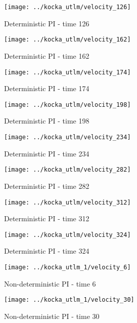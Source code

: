 \begin{figure}[h]
 \centering 
 \texttt{[image: ../kocka\_utlm/velocity\_126]}
 \caption{Deterministic PI - time 126}
\end{figure}


\begin{figure}[h]
 \centering 
 \texttt{[image: ../kocka\_utlm/velocity\_162]}
 \caption{Deterministic PI - time 162}
\end{figure}


\begin{figure}[h]
 \centering 
 \texttt{[image: ../kocka\_utlm/velocity\_174]}
 \caption{Deterministic PI - time 174}
\end{figure}


\begin{figure}[h]
 \centering 
 \texttt{[image: ../kocka\_utlm/velocity\_198]}
 \caption{Deterministic PI - time 198}
\end{figure}


\begin{figure}[h]
 \centering 
 \texttt{[image: ../kocka\_utlm/velocity\_234]}
 \caption{Deterministic PI - time 234}
\end{figure}


\begin{figure}[h]
 \centering 
 \texttt{[image: ../kocka\_utlm/velocity\_282]}
 \caption{Deterministic PI - time 282}
\end{figure}


\begin{figure}[h]
 \centering 
 \texttt{[image: ../kocka\_utlm/velocity\_312]}
 \caption{Deterministic PI - time 312}
\end{figure}


\begin{figure}[h]
 \centering 
 \texttt{[image: ../kocka\_utlm/velocity\_324]}
 \caption{Deterministic PI - time 324}
\end{figure}




\begin{figure}[h]
 \centering 
 \texttt{[image: ../kocka\_utlm\_1/velocity\_6]}
 \caption{Non-deterministic PI - time 6}
\end{figure}


\begin{figure}[h]
 \centering 
 \texttt{[image: ../kocka\_utlm\_1/velocity\_30]}
 \caption{Non-deterministic PI - time 30}
\end{figure}


